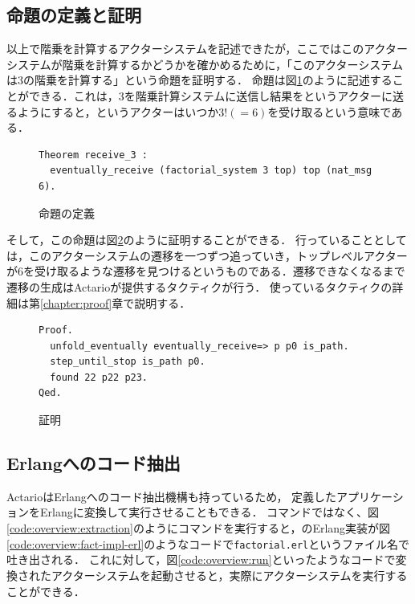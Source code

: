 \subsection{命題の定義と証明}

以上で階乗を計算するアクターシステムを記述できたが，ここではこのアクターシステムが階乗を計算するかどうかを確かめるために，「このアクターシステムは3の階乗を計算する」という命題を証明する．
命題は図\ref{code:overview:fact-spec}のように記述することができる．これは，$3$を階乗計算システムに送信し結果をというアクターに送るようにすると，というアクターはいつか$3! (= 6)$を受け取るという意味である．

\begin{figure}[tp]
\begin{lstlisting}
Theorem receive_3 :
  eventually_receive (factorial_system 3 top) top (nat_msg 6).
\end{lstlisting}
\label{code:overview:fact-spec}
\caption{命題の定義}
\end{figure}

そして，この命題は図\ref{code:overview:fact-proof}のように証明することができる．
行っていることとしては，このアクターシステムの遷移を一つずつ追っていき，トップレベルアクターが$6$を受け取るような遷移を見つけるというものである．遷移できなくなるまで遷移の生成はActarioが提供するタクティクが行う．
使っているタクティクの詳細は第\ref{chapter:proof}章で説明する．

\begin{figure}[tp]
\begin{lstlisting}
Proof.
  unfold_eventually eventually_receive=> p p0 is_path.
  step_until_stop is_path p0.
  found 22 p22 p23.
Qed.
\end{lstlisting}
  \label{code:overview:fact-proof}
  \caption{証明}
\end{figure}


\subsection{Erlangへのコード抽出}

ActarioはErlangへのコード抽出機構も持っているため，
定義したアプリケーションをErlangに変換して実行させることもできる．
コマンドではなく、図\ref{code:overview:extraction}のようにコマンドを実行すると，のErlang実装が図\ref{code:overview:fact-impl-erl}のようなコードで\texttt{factorial.erl}というファイル名で吐き出される．
これに対して，図\ref{code:overview:run}といったようなコードで変換されたアクターシステムを起動させると，実際にアクターシステムを実行することができる．

